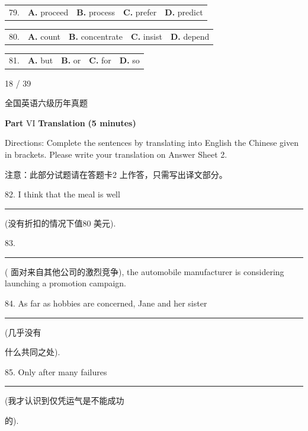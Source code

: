 \documentclass[UTF8,11pt]{ctexart}
\begin{document}
\noindent\begin{tabularx}{\linewidth}{@{}lXXXX@{}}79. & \textbf{A.} proceed & \textbf{B.} process & \textbf{C.} prefer & \textbf{D.} predict\\\end{tabularx}\par

\noindent\begin{tabularx}{\linewidth}{@{}lXXXX@{}}80. & \textbf{A.} count & \textbf{B.} concentrate & \textbf{C.} insist & \textbf{D.} depend\\\end{tabularx}\par

\noindent\begin{tabularx}{\linewidth}{@{}lXXXX@{}}81. & \textbf{A.} but & \textbf{B.} or & \textbf{C.} for & \textbf{D.} so\\\end{tabularx}\par

18 / 39


全国英语六级历年真题


\textbf{Part} VI \textbf{Translation} \textbf{(5 minutes)}


Directions: Complete the sentences by translating into English the Chinese given in brackets. Please write your translation on Answer Sheet 2.


注意：此部分试题请在答题卡2 上作答，只需写出译文部分。


82. I think that the meal is well \par\noindent\rule{.95\linewidth}{.4pt}\par (没有折扣的情况下值80 美元).


83. \par\noindent\rule{.95\linewidth}{.4pt}\par  ( 面对来自其他公司的激烈竞争), the automobile manufacturer is considering launching a promotion campaign.


84. As far as hobbies are concerned, Jane and her sister \par\noindent\rule{.95\linewidth}{.4pt}\par  (几乎没有


什么共同之处).


85. Only after many failures\par\noindent\rule{.95\linewidth}{.4pt}\par  (我才认识到仅凭运气是不能成功


的).
\end{document}
